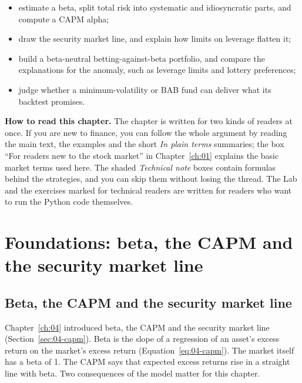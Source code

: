 \begin{itemize}
  \item estimate a beta, split total risk into systematic and idiosyncratic parts, and compute a CAPM alpha;
  \item draw the security market line, and explain how limits on leverage flatten it;
  \item build a beta-neutral betting-against-beta portfolio, and compare the explanations for the anomaly, such as leverage limits and lottery preferences;
  \item judge whether a minimum-volatility or BAB fund can deliver what its backtest promises.
\end{itemize}

\begin{callout}
\textbf{How to read this chapter.} The chapter is written for two kinds of readers at once. If you are new to finance, you can follow the whole argument by reading the main text, the examples and the short \emph{In plain terms} summaries; the box ``For readers new to the stock market'' in Chapter~\ref{ch:01} explains the basic market terms used here. The shaded \emph{Technical note} boxes contain formulas behind the strategies, and you can skip them without losing the thread. The Lab and the exercises marked for technical readers are written for readers who want to run the Python code themselves.
\end{callout}

\section{Foundations: beta, the CAPM and the security market line}
\label{sec:18-foundations}

\subsection{Beta, the CAPM and the security market line}

Chapter~\ref{ch:04} introduced beta, the CAPM and the security market line (Section~\ref{sec:04-capm}). Beta is the slope of a regression of an asset's excess return on the market's excess return (Equation~\eqref{eq:04-capm}). The market itself has a beta of 1. The CAPM says that expected excess returns rise in a straight line with beta. Two consequences of the model matter for this chapter.

